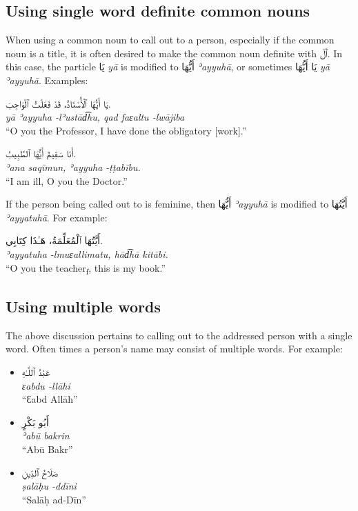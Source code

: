 \documentclass[
  10pt,
]{book}
\begin{document}
\subsection{Using single word definite common nouns}\label{using-single-word-definite-common-nouns}

When using a common noun to call out to a person, especially if the common noun is a title, it is often desired to make the common noun definite with \foreignlanguage{arabic}{ٱَلْ}. In this case, the particle \foreignlanguage{arabic}{يَا} \emph{yā} is modified to \foreignlanguage{arabic}{أَيُّهَا} \emph{ʾayyuhā}, or sometimes \foreignlanguage{arabic}{يَا أَيُّهَا} \emph{yā ʾayyuhā}. Examples:

\foreignlanguage{arabic}{يَا أَيُّهَا ٱلْأُسْتَاذُ، قَدْ فَعَلْتُ ٱلْوَاجِبَ.}\\
\emph{yā ʾayyuha -lʾustād͡hu, qad faɛaltu -lwājiba}\\
\enquote{O you the Professor, I have done the obligatory {[}work{]}.}

\foreignlanguage{arabic}{أَنَا سَقِيمٌ أَيُّهَا ٱلطَّبِيبُ.}\\
\emph{ʾana saqīmun, ʾayyuha -ṭṭabību.}\\
\enquote{I am ill, O you the Doctor.}

If the person being called out to is feminine, then \foreignlanguage{arabic}{أَيُّهَا} \emph{ʾayyuhā} is modified to \foreignlanguage{arabic}{أَيَّتُهَا} \emph{ʾayyatuhā}. For example:

\foreignlanguage{arabic}{أَيَّتُهَا ٱلْمُعَلِّمَةُ، هَـٰذَا کِتَابِي.}\\
\emph{ʾayyatuha -lmuɛallimatu, hād͡hā kitābi.}\\
\enquote{O you the teacher\textsubscript{f}, this is my book.}

\subsection{Using multiple words}\label{using-multiple-words}

The above discussion pertains to calling out to the addressed person with a single word. Often times a person's name may consist of multiple words. For example:

\begin{itemize}
\item
  \foreignlanguage{arabic}{عَبْدُ ٱللَّـٰهِ}\\
  \emph{ɛabdu -llāhi}\\
  \enquote{Ɛabd Allāh}
\item
  \foreignlanguage{arabic}{أَبُو بَکْرٍ}\\
  \emph{ʾabū bakrin}\\
  \enquote{Abū Bakr}
\item
  \foreignlanguage{arabic}{صَلَاحُ ٱلدِّينِ}\\
  \emph{ṣalāḥu -ddīni}\\
  \enquote{Salāḥ ad-Dīn}
\end{itemize}
\end{document}
